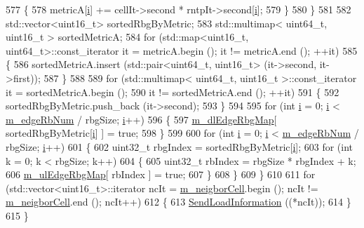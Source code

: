 \begin{DoxyCode}
577             \{
578               metricA[\hyperlink{bernuolliDistribution_8m_a6f6ccfcf58b31cb6412107d9d5281426}{i}] += cellIt->second * rntpIt->second[\hyperlink{bernuolliDistribution_8m_a6f6ccfcf58b31cb6412107d9d5281426}{i}];
579             \}
580         \}
581 
582       std::vector<uint16\_t> sortedRbgByMetric;
583       std::multimap< uint64\_t, uint16\_t > sortedMetricA;
584       \textcolor{keywordflow}{for} (std::map<uint16\_t, uint64\_t>::const\_iterator it = metricA.begin (); it != metricA.end (); ++it)
585         \{
586           sortedMetricA.insert (std::pair<uint64\_t, uint16\_t> (it->second, it->first));
587         \}
588 
589       \textcolor{keywordflow}{for} (std::multimap< uint64\_t, uint16\_t >::const\_iterator it = sortedMetricA.begin ();
590            it != sortedMetricA.end (); ++it)
591         \{
592           sortedRbgByMetric.push\_back (it->second);
593         \}
594 
595       \textcolor{keywordflow}{for} (\textcolor{keywordtype}{int} \hyperlink{bernuolliDistribution_8m_a6f6ccfcf58b31cb6412107d9d5281426}{i} = 0; \hyperlink{bernuolliDistribution_8m_a6f6ccfcf58b31cb6412107d9d5281426}{i} < \hyperlink{classns3_1_1LteFfrDistributedAlgorithm_a93d1edadbdbf673c780413e7232fec02}{m\_edgeRbNum} / rbgSize; \hyperlink{bernuolliDistribution_8m_a6f6ccfcf58b31cb6412107d9d5281426}{i}++)
596         \{
597           \hyperlink{classns3_1_1LteFfrDistributedAlgorithm_ae8146d08135496d887ac9a5fac8a3f5a}{m\_dlEdgeRbgMap}[ sortedRbgByMetric[\hyperlink{bernuolliDistribution_8m_a6f6ccfcf58b31cb6412107d9d5281426}{i}] ] = \textcolor{keyword}{true};
598         \}
599 
600       \textcolor{keywordflow}{for} (\textcolor{keywordtype}{int} \hyperlink{bernuolliDistribution_8m_a6f6ccfcf58b31cb6412107d9d5281426}{i} = 0; \hyperlink{bernuolliDistribution_8m_a6f6ccfcf58b31cb6412107d9d5281426}{i} < \hyperlink{classns3_1_1LteFfrDistributedAlgorithm_a93d1edadbdbf673c780413e7232fec02}{m\_edgeRbNum} / rbgSize; \hyperlink{bernuolliDistribution_8m_a6f6ccfcf58b31cb6412107d9d5281426}{i}++)
601         \{
602           uint32\_t rbgIndex = sortedRbgByMetric[\hyperlink{bernuolliDistribution_8m_a6f6ccfcf58b31cb6412107d9d5281426}{i}];
603           \textcolor{keywordflow}{for} (\textcolor{keywordtype}{int} k = 0; k < rbgSize; k++)
604             \{
605               uint32\_t rbIndex = rbgSize * rbgIndex + k;
606               \hyperlink{classns3_1_1LteFfrDistributedAlgorithm_a9a2969aa567092eb87a9802fc2fed706}{m\_ulEdgeRbgMap}[ rbIndex ] = \textcolor{keyword}{true};
607             \}
608         \}
609     \}
610 
611   \textcolor{keywordflow}{for} (std::vector<uint16\_t>::iterator ncIt = \hyperlink{classns3_1_1LteFfrDistributedAlgorithm_a824ee5482f34a9ce23948de09981103f}{m\_neigborCell}.begin (); ncIt != 
      \hyperlink{classns3_1_1LteFfrDistributedAlgorithm_a824ee5482f34a9ce23948de09981103f}{m\_neigborCell}.end (); ncIt++)
612     \{
613       \hyperlink{classns3_1_1LteFfrDistributedAlgorithm_afa2a26377e06993e948eb0aea3c3a717}{SendLoadInformation} ((*ncIt));
614     \}
615 \}
\end{DoxyCode}


